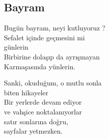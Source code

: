 \subsection{Bayram}

Bugün bayram, neyi kutluyoruz ? \\
Sefalet içinde geçmesini mi \\
günlerin \\
Birbirine dolaşıp da ayrışmayan \\
Karmaşasında yünlerin.

\noindent\newline
Sanki, okuduğum, o mutlu sonla \\
biten hikayeler \\
Bir yerlerde devam ediyor \\
ve vahşice noktalanıyorlar \\
satır sonlarına doğru, \\
sayfalar yetmezken.
